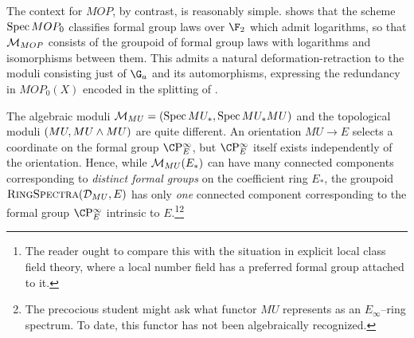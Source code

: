 
\begin{example}\label{ContextOfMOPExample}
The context for \(MOP\), by contrast, is reasonably simple.   shows that the scheme \(\operatorname{Spec} MOP_0\) classifies formal group laws over \(\F_2\) which admit logarithms, so that \(\mathcal{M}_{MOP}\) consists of the groupoid of formal group laws with logarithms and isomorphisms between them.  This admits a natural deformation-retraction to the moduli consisting just of \(\G_a\) and its automorphisms, expressing the redundancy in \(MOP_0(X)\) encoded in the splitting of .
\end{example}

\begin{remark}\label{MUstarVsMUAsModuli}
The algebraic moduli \(\mathcal{M}_{MU} = (\operatorname{Spec} MU_*, \operatorname{Spec} MU_* MU)\) and the topological moduli \((MU, MU \wedge MU)\) are quite different.  An orientation \(MU \to E\) selects a coordinate on the formal group \(\CP^\infty_E\), but \(\CP^\infty_E\) itself exists independently of the orientation.  Hence, while \(\mathcal{M}_{MU}(E_*)\) can have many connected components corresponding to \emph{distinct formal groups} on the coefficient ring \(E_*\), the groupoid \(\normalfont\textsc{RingSpectra}(\mathcal{D}_{MU}, E)\) has only \emph{one} connected component corresponding to the formal group \(\CP^\infty_E\) intrinsic to \(E\).\footnote{The reader ought to compare this with the situation in explicit local class field theory, where a local number field has a preferred formal group attached to it.}\footnote{The precocious student might ask what functor \(MU\) represents as an \(E_\infty\)--ring spectrum.  To date, this functor has not been algebraically recognized.}
\end{remark}

